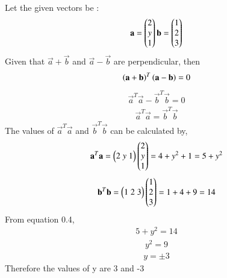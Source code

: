 \documentclass[journal]{IEEEtran}
\begin{document}
         \solution \\
         Let the given vectors be :\\ 
         \begin{align}
             \mathbf{a}=\begin{pmatrix}2\\y\\1\end{pmatrix}  \mathbf{b}=\begin{pmatrix}1\\2\\3\end{pmatrix}
         \end{align}
         Given that $\vec{a}+\vec{b}$ and $\vec{a}-\vec{b}$  are perpendicular, then \\
         \begin{align}
             \left(\mathbf{a}+\mathbf{b}\right)^T\left(\mathbf{a}-\mathbf{b}\right)=0
         \end{align}
         \begin{align}
             \vec{a}^T\vec{a}-\vec{b}^T\vec{b}=0
         \end{align}
         \begin{align}
             \vec{a}^T\vec{a}=\vec{b}^T\vec{b}
         \end{align}
         The values of $\vec{a}^T\vec{a}$ and $\vec{b}^T\vec{b}$ can be calculated by,
         \begin{align}
             \mathbf{a}^T\mathbf{a}=\begin{pmatrix}2\;y\;1\end{pmatrix}\begin{pmatrix}2\\y\\1\end{pmatrix}=4+y^2+1=5+y^2
         \end{align}
         \begin{align}
             \mathbf{b}^T\mathbf{b}=\begin{pmatrix}1\;2\;3\end{pmatrix}\begin{pmatrix}1\\2\\3\end{pmatrix}=1+4+9=14
         \end{align}
         From equation 0.4,\\
         \begin{align}
             5+y^2=14
         \end{align}
         \begin{align}
             y^2=9
         \end{align}
         \begin{align}
             y=\pm3
         \end{align}
         Therefore the values of y are 3 and -3
\end{document}
